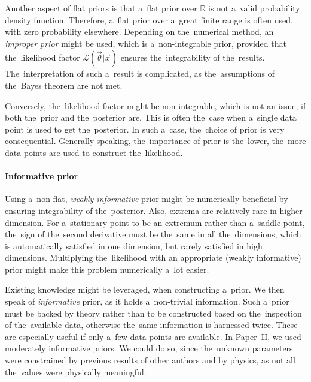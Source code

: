 Another aspect of flat priors is that a~flat prior over $\mathbb{R}$ is not a~valid probability density function. Therefore, a~flat prior over a~great finite range is often used, with zero probability elsewhere. Depending on the~numerical method, an \textit{improper prior} might be used, which is a~non-integrable prior, provided that the~likelihood factor $\mathcal{L}(\vec{\theta}|\vec{x})$ ensures the~integrability of the~results. The~interpretation of such a~result is complicated, as the~assumptions of the~Bayes theorem are not met. 

Conversely, the~likelihood factor might be non-integrable, which is not an issue, if both the~prior and the~posterior are. This is often the~case when a~single data point is used to get the~posterior. In such a~case, the~choice of prior is very consequential. Generally speaking, the~importance of prior is the~lower, the~more data points are used to construct the~likelihood.

\paragraph{Informative prior} Using a~non-flat, \textit{weakly informative} prior might be numerically beneficial by ensuring integrability of the~posterior. Also, extrema are relatively rare in higher dimension. For a~stationary point to be an extremum rather than a~saddle point, the~sign of the~second derivative must be the~same in all the~dimensions, which is automatically satisfied in one dimension, but rarely satisfied in high dimensions. Multiplying the~likelihood with an appropriate (weakly informative) prior might make this problem numerically a~lot easier. 

Existing knowledge might be leveraged, when constructing a~prior. We then speak of \textit{informative} prior, as it holds a~non-trivial information. Such a~prior must be backed by theory rather than to be constructed based on the~inspection of the~available data, otherwise the~same information is harnessed twice. These are especially useful if only a~few data points are available. In Paper~II, we used moderately informative priors. We could do so, since the~unknown parameters were constrained by previous results of other authors and by physics, as not all the~values were physically meaningful. 







